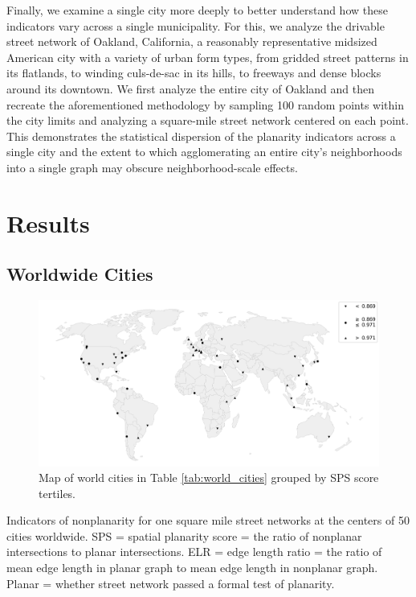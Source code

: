 \documentclass[Afour,sageh,times]{sagej}
\begin{document}
Finally, we examine a single city more deeply to better understand how these indicators vary across a single municipality. For this, we analyze the drivable street network of Oakland, California, a reasonably representative midsized American city with a variety of urban form types, from gridded street patterns in its flatlands, to winding culs-de-sac in its hills, to freeways and dense blocks around its downtown. We first analyze the entire city of Oakland and then recreate the aforementioned methodology by sampling 100 random points within the city limits and analyzing a square-mile street network centered on each point. This demonstrates the statistical dispersion of the planarity indicators across a single city and the extent to which agglomerating an entire city's neighborhoods into a single graph may obscure neighborhood-scale effects.





\section{Results}

\subsection{Worldwide Cities}

\begin{figure}[htbp]
    \center
    \includegraphics[width=\textwidth]{world_map_phi_bw.png}
    \caption{Map of world cities in Table \ref{tab:world_cities} grouped by SPS score tertiles.}
    \label{fig:world_map_bw}
\end{figure}


\begin{table}[htbp]
\centering
\caption{Indicators of nonplanarity for one square mile street networks at the centers of 50 cities worldwide. SPS = spatial planarity score = the ratio of nonplanar intersections to planar intersections. ELR = edge length ratio = the ratio of mean edge length in planar graph to mean edge length in nonplanar graph. Planar = whether street network passed a formal test of planarity.}
\label{tab:world_cities}

\end{table}
\end{document}
